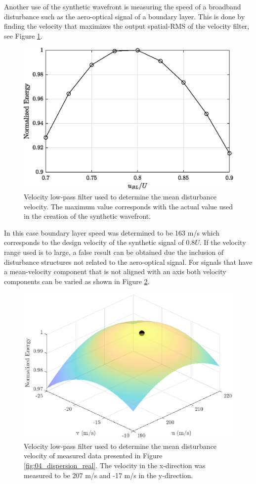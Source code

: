 Another use of the synthetic wavefront is measuring the speed of a broadband disturbance such as the aero-optical signal of a boundary layer.
This is done by finding the velocity that maximizes the output spatial-RMS of the velocity filter, see Figure \ref{fig:04_filter_velocity_measure}.
\begin{figure}
  \centering
  \includegraphics{../matlab/04_basic_filtering/filter_velocity_measure.eps}
  \caption{Velocity low-pass filter used to determine the mean disturbance velocity.  The maximum value corresponds with the actual value used in the creation of the synthetic wavefront.}
  \label{fig:04_filter_velocity_measure}
\end{figure}
In this case boundary layer speed was determined to be 163 m/s which corresponds to the design velocity of the synthetic signal of $0.8U$.
If the velocity range used is to large, a false result can be obtained due the inclusion of disturbance structures not related to the aero-optical signal.
For signals that have a mean-velocity component that is not aligned with an axis both velocity components can be varied as shown in Figure \ref{fig:04_filter_velocity_real}.
\begin{figure}
  \centering
  \includegraphics{../matlab/04_basic_filtering/filter_velocity_real.eps}
  \caption{Velocity low-pass filter used to determine the mean disturbance velocity of measured data presented in Figure \ref{fig:04_dispersion_real}.  The velocity in the x-direction was measured to be 207 m/s and -17 m/s in the y-direction.}
  \label{fig:04_filter_velocity_real}
\end{figure}
